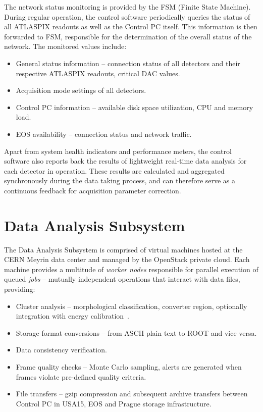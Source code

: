 \documentclass[conference]{IEEEtran}
\begin{document}
The network status monitoring is provided by the FSM (Finite State Machine). During regular operation, the control software periodically queries the status of all ATLASPIX readouts as well as the Control PC itself. This information is then forwarded to FSM, responsible for the determination of the overall status of the network. The monitored values include:
~
\begin{itemize}
  \item General status information -- connection status of all detectors and their respective ATLASPIX readouts, critical DAC values.
  \item Acquisition mode settings of all detectors.
  \item Control PC information -- available disk space utilization, CPU and memory load.
  \item EOS availability -- connection status and network traffic.
\end{itemize}

Apart from system health indicators and performance meters, the control software also reports back the results of lightweight real-time data analysis for each detector in operation. These results are calculated and aggregated synchronously during the data taking process, and can therefore serve as a continuous feedback for acquisition parameter correction.


\section{\label{sec:analysis}Data Analysis Subsystem}
The Data Analysis Subsystem is comprised of virtual machines hosted at the CERN Meyrin data center and managed by the OpenStack private cloud. Each machine provides a multitude of \textit{worker nodes} responsible for parallel execution of queued \textit{jobs} -- mutually independent operations that interact with data files, providing:
~
\begin{itemize}
  \item Cluster analysis -- morphological classification, converter region, optionally integration with energy calibration~\cite{Holy2008}.
  \item Storage format conversions -- from ASCII plain text to ROOT and vice versa.
  \item Data consistency verification.
  \item Frame quality checks -- Monte Carlo sampling, alerts are generated when frames violate pre-defined quality criteria.
  \item File transfers -- gzip compression and subsequent archive transfers between Control PC in USA15, EOS and Prague storage infrastructure.
\end{itemize}
\end{document}

